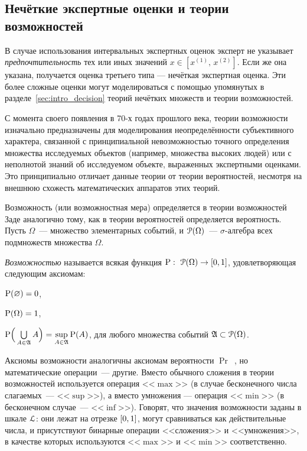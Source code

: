 \subsection{Нечёткие экспертные оценки и теории возможностей}

В случае использования интервальных экспертных оценок эксперт не указывает {\sl предпочтительность} тех или иных значений $x \in [x^{(1)},\, x^{(2)}]$. Если же она указана, получается оценка третьего типа --- нечёткая экспертная оценка. Эти более сложные оценки могут моделироваться с помощью упомянутых в разделе~\ref{sec:intro_decision} теорий нечётких множеств и теории возможностей.

С момента своего появления в 70-х годах прошлого века, теории возможности изначально предназначены для моделирования неопределённости субъективного характера, связанной с принципиальной невозможностью точного определения множества исследуемых объектов (например, множества высоких людей) или с неполнотой знаний об исследуемом объекте, выраженных экспертными оценками. Это принципиально отличает данные теории от теории вероятностей, несмотря на внешнюю схожесть математических аппаратов этих теорий. 

Возможность (или возможностная мера) определяется в теории возможностей Заде \cite{citeZadeh, dubois_prade-1990} аналогично тому, как в теории вероятностей определяется вероятность. Пусть $\Omega$~--- множество элементарных событий, и $\Po(\Omega)$~--- $\sigma$-алгебра всех подмножеств множества $\Omega$.
\begin{definition}
\label{def_possibility}
\emph{Возможностью} называется всякая функция $\P:\ \Po(\Omega)\to[0,1]$, удовлетворяющая следующим аксиомам:
\begin{compactenum}
\item $\P(\varnothing) = 0$,\label{axiom_P1}
\item $\P(\Omega) = 1$,\label{axiom_P2}
\item $\P\Big(\bigcup\limits_{A\in\Alg} A\Big) = \sup\limits_{A\in\Alg}\P(A)$, для любого множества событий $\Alg\subset\Po(\Omega)$.\label{axiom_P3}
\end{compactenum}
\end{definition}

Аксиомы возможности аналогичны аксиомам вероятности $\Pr$~\cite{kolmogorov}, но математические операции~--- другие. Вместо обычного сложения в теории возможностей используется операция <<$\max$>> (в случае бесконечного числа слагаемых~--- <<$\sup$>>), а вместо умножения --- операция <<$\min$>> (в бесконечном случае~--- <<$\inf$>>). Говорят, что значения возможности заданы в шкале $\scL$: они лежат на отрезке $\zo$, могут сравниваться как действительные числа, и присутствуют бинарные операции <<сложения>> и <<умножения>>, в качестве которых используются <<$\max$>> и <<$\min$>> соответственно. 

